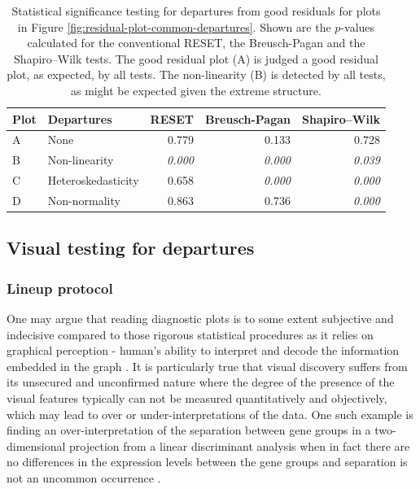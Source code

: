 \documentclass[]{interact}
\theoremstyle{plain}%
\theoremstyle{definition}
\theoremstyle{remark}
\begin{document}
\begin{table}

\caption{\label{tab:example-residual-plot-table}Statistical significance testing for departures from good residuals for plots in Figure \ref{fig:residual-plot-common-departures}. Shown are the $p$-values calculated for the conventional RESET, the Breusch-Pagan and the Shapiro–Wilk tests. The good residual plot (A) is judged a good residual plot, as expected, by all tests. The non-linearity (B) is detected by all tests, as might be expected given the extreme structure.}
\centering
\begin{tabular}[t]{llrrr}
\toprule
Plot & Departures & RESET & Breusch-Pagan & Shapiro–Wilk\\
\midrule
A & None & 0.779 & 0.133 & 0.728\\
B & Non-linearity & \em{0.000} & \em{0.000} & \em{0.039}\\
C & Heteroskedasticity & 0.658 & \em{0.000} & \em{0.000}\\
D & Non-normality & 0.863 & 0.736 & \em{0.000}\\
\bottomrule
\end{tabular}
\end{table}

\hypertarget{visual-testing-for-departures}{%
\subsection{Visual testing for
departures}\label{visual-testing-for-departures}}

\hypertarget{lineup-protocol}{%
\subsubsection{Lineup protocol}\label{lineup-protocol}}

One may argue that reading diagnostic plots is to some extent subjective
and indecisive compared to those rigorous statistical procedures as it
relies on graphical perception - human's ability to interpret and decode
the information embedded in the graph \citep{cleveland_graphical_1984}.
It is particularly true that visual discovery suffers from its unsecured
and unconfirmed nature where the degree of the presence of the visual
features typically can not be measured quantitatively and objectively,
which may lead to over or under-interpretations of the data. One such
example is finding an over-interpretation of the separation between gene
groups in a two-dimensional projection from a linear discriminant
analysis when in fact there are no differences in the expression levels
between the gene groups and separation is not an uncommon occurrence
\citep{roy_chowdhury_using_2015}.
\end{document}
